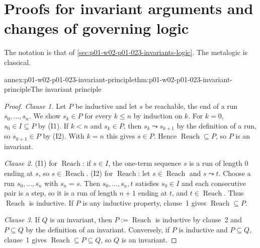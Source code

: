 \section{Proofs for invariant arguments and changes of governing logic}
\label{sec:annex-p01-w02-p01-023-invariants-logic}

The notation is that of \cref{sec:p01-w02-p01-023-invariants-logic}. The
metalogic is classical.

\begin{annexitem}{annex:p01-w02-p01-023-invariant-principle}{thm:p01-w02-p01-023-invariant-principle}{The invariant principle}
\begin{proof}
\emph{Clause 1.} Let \(P\) be inductive and let \(s\) be reachable, the end
of a run \(s_0,\ldots,s_n\). We show \(s_k\in P\) for every \(k\leq n\) by
induction on \(k\). For \(k=0\), \(s_0\in I\subseteq P\) by (I1). If
\(k<n\) and \(s_k\in P\), then \(s_k\leadsto s_{k+1}\) by the definition of
a run, so \(s_{k+1}\in P\) by (I2). With \(k=n\) this gives \(s\in P\).
Hence \(\operatorname{Reach}\subseteq P\), so \(P\) is an invariant.

\emph{Clause 2.} (I1) for \(\operatorname{Reach}\): if \(s\in I\), the
one-term sequence \(s\) is a run of length \(0\) ending at \(s\), so
\(s\in\operatorname{Reach}\). (I2) for \(\operatorname{Reach}\): let
\(s\in\operatorname{Reach}\) and \(s\leadsto t\). Choose a run
\(s_0,\ldots,s_n\) with \(s_n=s\). Then \(s_0,\ldots,s_n,t\) satisfies
\(s_0\in I\) and each consecutive pair is a step, so it is a run of length
\(n+1\) ending at \(t\), and \(t\in\operatorname{Reach}\). Thus
\(\operatorname{Reach}\) is inductive. If \(P\) is any inductive property,
clause~1 gives \(\operatorname{Reach}\subseteq P\).

\emph{Clause 3.} If \(Q\) is an invariant, then
\(P:=\operatorname{Reach}\) is inductive by clause~2 and
\(P\subseteq Q\) by the definition of an invariant. Conversely, if \(P\) is
inductive and \(P\subseteq Q\), clause~1 gives
\(\operatorname{Reach}\subseteq P\subseteq Q\), so \(Q\) is an invariant.
\end{proof}
\end{annexitem}

